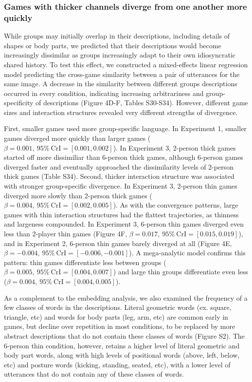 \documentclass[9pt,twocolumn,twoside]{pnas-new}
\begin{document}
\subsubsection*{Games with thicker channels diverge from one another
more
quickly}\label{games-with-thicker-channels-diverge-from-one-another-more-quickly}

While groups may initially overlap in their descriptions, including
details of shapes or body parts, we predicted that their descriptions
would become increasingly dissimilar as groups increasingly adapt to
their own idiosyncratic shared history. To test this effect, we
constructed a mixed-effects linear regression model predicting the
cross-game similarity between a pair of utterances for the same image. A
decrease in the similarity between different groups descriptions
occurred in every condition, indicating increasing arbitrariness and
group-specificity of descriptions (Figure 4D-F, Tables
S30-S34). However, different game sizes and interaction structures
revealed very different strengths of divergence.

First, smaller games used more group-specific language. In Experiment 1,
smaller games diverged more quickly than larger games
(\(\beta=0.001,\:95\%\:\mathrm{CrI}=[0.001, 0.002]\)). In Experiment 3,
2-person thick games started off more dissimiliar than 6-person thick
games, although 6-person games diverged faster and eventually approached
the dissimilarity levels of 2-person thick games (Table S34). Second,
thicker interaction structure was associated with stronger
group-specific divergence. In Experiment 3, 2-person thin games diverged
more slowly than 2-person thick games
(\(\beta=0.004,\:95\%\:\mathrm{CrI}=[0.002, 0.005]\)). As with the
convergence patterns, large games with thin interaction structures had
the flattest trajectories, as thinness and largeness compounded. In
Experiment 3, 6-person thin games diverged even less than 2-player thin
games (Figure 4F,
\(\beta=0.017,\:95\%\:\mathrm{CrI}=[0.015, 0.019]\)), and in Experiment
2, 6-person thin games barely diverged at all (Figure 4E,
\(\beta=-0.004,\:95\%\:\mathrm{CrI}=[-0.006, -0.001]\)). A mega-analytic
model confirms this pattern: thin games differentiate less between
groups (\(\beta=0.005,\:95\%\:\mathrm{CrI}=[0.004, 0.007]\)) and large
thin groups differentiate even less
(\(\beta=0.004,\:95\%\:\mathrm{CrI}=[0.004, 0.005]\)).

As a complement to the embedding analysis, we also examined the
frequency of a few classes of words in the descriptions. Literal
geometric words (ex. square, triangle, etc) and words for body parts
(leg, arm, etc) are common early in games, but decline over repetition
in most conditions, to be replaced by more abstract descriptions that do
not contain these classes of words (Figure S2). The 6-person thin
condition, however, retains a higher level of literal geometric and body
part words, along with high levels of positional words (above, left,
below, etc) and posture words (kicking, standing, seated, etc), with a
lower level of utterances that do not contain any of these classes of
words.
\end{document}
